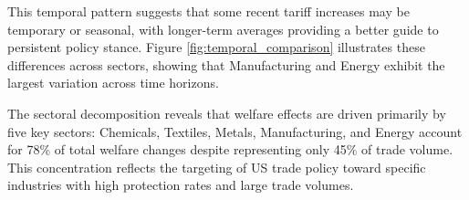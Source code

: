 This temporal pattern suggests that some recent tariff increases may be temporary or seasonal, with longer-term averages providing a better guide to persistent policy stance. Figure \ref{fig:temporal_comparison} illustrates these differences across sectors, showing that Manufacturing and Energy exhibit the largest variation across time horizons.

The sectoral decomposition reveals that welfare effects are driven primarily by five key sectors: Chemicals, Textiles, Metals, Manufacturing, and Energy account for 78\% of total welfare changes despite representing only 45\% of trade volume. This concentration reflects the targeting of US trade policy toward specific industries with high protection rates and large trade volumes.
